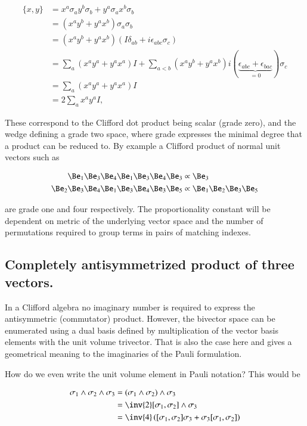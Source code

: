 \documentclass{article}
\newcommand{\symmetric}[2]{{\{{#1},{#2}\}}}
\newcommand{\antisymmetric}[2]{[{#1},{#2}]}
\begin{document}
\begin{align*}
\symmetric{x}{y} 
&= x^a \sigma_a y^b \sigma_b + y^a \sigma_a x^b \sigma_b \\
&= (x^a y^b + y^a x^b) \sigma_a \sigma_b \\
&= (x^a y^b + y^a x^b) ( I \delta_{a b} + i \epsilon_{a b c} \sigma_c) \\
&= \sum_a (x^a y^a + y^a x^a) I  
+\sum_{a<b}(x^a y^b + y^a x^b) i (\underbrace{\epsilon_{a b c} + \epsilon_{b a c}}_{=0}) \sigma_c \\
&= \sum_a (x^a y^a + y^a x^a) I \\
&= 2 \sum_a x^a y^a I,
\end{align*}

These correspond to the Clifford dot product being scalar (grade zero), and the wedge defining a grade two space, where grade expresses the minimal degree that a product can be reduced to.  By example a Clifford product of normal unit vectors such as

\begin{align*}
\Be_1 \Be_3 \Be_4 \Be_1 \Be_3 \Be_4 \Be_3 &\propto \Be_3 \\
\Be_2 \Be_3 \Be_4 \Be_1 \Be_3 \Be_4 \Be_3 \Be_5 &\propto \Be_1 \Be_2 \Be_3 \Be_5
\end{align*}

are grade one and four respectively.  The proportionality constant will be dependent on metric of the underlying vector space and the number of permutations required to group terms in pairs of matching indexes.

\subsection{ Completely antisymmetrized product of three vectors. }

In a Clifford algebra no imaginary number is required to express the antisymmetric (commutator) product.  However, the bivector space can be enumerated using a dual basis defined by multiplication of the vector basis elements with the unit volume trivector.  That is also the case here and gives a geometrical meaning to the imaginaries of the Pauli formulation.

How do we even write the unit volume element in Pauli notation?  This would be

\begin{align*}
\sigma_1 \wedge \sigma_2 \wedge \sigma_3 
&= (\sigma_1 \wedge \sigma_2) \wedge \sigma_3 \\
&= \inv{2} \antisymmetric{\sigma_1}{\sigma_2} \wedge \sigma_3 \\
&= \inv{4} \left( \antisymmetric{\sigma_1}{\sigma_2} \sigma_3 + \sigma_3 \antisymmetric{\sigma_1}{\sigma_2} \right) \\
\end{align*}
\end{document}
